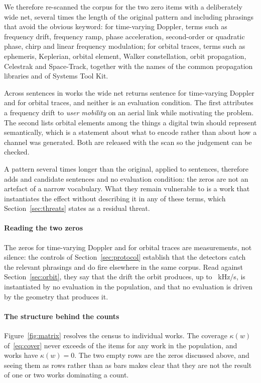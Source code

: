 \documentclass[preprint,11pt,3p]{elsarticle}
\begin{document}
We therefore re-scanned the corpus for the two zero items with a deliberately wide net, several
times the length of the original pattern and including phrasings that avoid the obvious keyword:
for time-varying Doppler, terms such as frequency drift, frequency ramp, phase acceleration,
second-order or quadratic phase, chirp and linear frequency modulation; for orbital traces, terms
such as ephemeris, Keplerian, orbital element, Walker constellation, orbit propagation, Celestrak
and Space-Track, together with the names of the common propagation libraries and of Systems Tool
Kit.

Across \numWideSent{} sentences in \numWideDocs{} works the wide net returns
\numWideRate{} sentence for time-varying Doppler and \numWideTrace{} for orbital traces, and
neither is an evaluation condition. The first attributes a frequency drift to \emph{user
mobility} on an aerial link while motivating the problem. The second lists orbital elements among
the things a digital twin should represent semantically, which is a statement about what to
encode rather than about how a channel was generated. Both are released with the scan so the
judgement can be checked.

A pattern several times longer than the original, applied to \numWideSent{} sentences,
therefore adds \numWideRate{} and \numWideTrace{} candidate sentences and no evaluation
condition: the zeros are not an artefact of a narrow vocabulary. What they remain vulnerable to is
a work that instantiates the effect without describing it in any of these terms, which
Section~\ref{sec:threats} states as a residual threat.

\paragraph{Reading the two zeros}
The zeros for time-varying Doppler and for orbital traces are measurements, not silence: the
controls of Section~\ref{sec:protocol} establish that the detectors catch the relevant phrasings
and do fire elsewhere in the same corpus. Read against Section~\ref{sec:orbit}, they say that the
drift the orbit produces, up to \numDopRateMax~kHz/s, is instantiated by no evaluation in the
population, and that no evaluation is driven by the geometry that produces it.

\paragraph{The structure behind the counts}
Figure~\ref{fig:matrix} resolves the census to individual works. The coverage $\kappa(w)$ of~\eqref{eq:cover} never exceeds \numMaxCover{} of the
\numChecklist{} items for any work in the population, and \numZeroCover{} works have
$\kappa(w) = 0$. The two empty rows are the zeros discussed above, and seeing them as
rows rather than as bars makes clear that they are not the result of one or two works dominating
a count.
\end{document}
